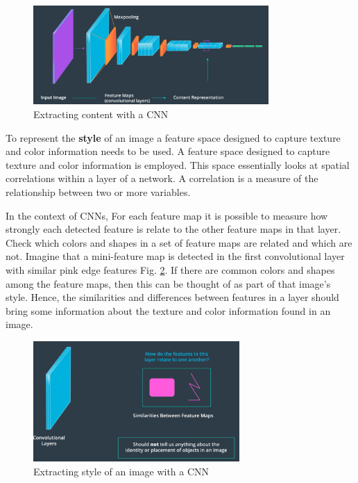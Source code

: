 \documentclass{article}
\begin{document}
\begin{figure}[ht]
    \centering
    \includegraphics[width=0.8\textwidth,height=0.8\textheight,keepaspectratio]{images/content.png}
    \captionsetup{justification=centering}
    \caption{Extracting content with a CNN}
    \label{fig:f2}
\end{figure}

To represent the \textbf{style} of an image a feature space designed to capture texture and color information needs to be used. A feature space designed to capture texture and color information is employed. This space essentially looks at spatial correlations within a layer of a network. A correlation is a measure of the relationship between two or more variables.

In the context of CNNs, For each feature map it is possible to measure how strongly each detected feature is relate to the other feature maps in that layer. Check which colors and shapes in a set of feature maps are related and which are not. Imagine that a mini-feature map is detected in the first convolutional layer with similar pink edge features Fig. \ref{fig:f3}. If there are common colors and shapes among the feature maps, then this can be thought of as part of that image's style. Hence, the similarities and differences between features in a layer should bring some information about the texture and color information found in an image.


\begin{figure}[ht]
    \centering
    \includegraphics[width=0.7\textwidth,height=0.7\textheight,keepaspectratio]{images/style.png}
    \captionsetup{justification=centering}
    \caption{Extracting style of an image with a CNN}
    \label{fig:f3}
\end{figure}
\end{document}
